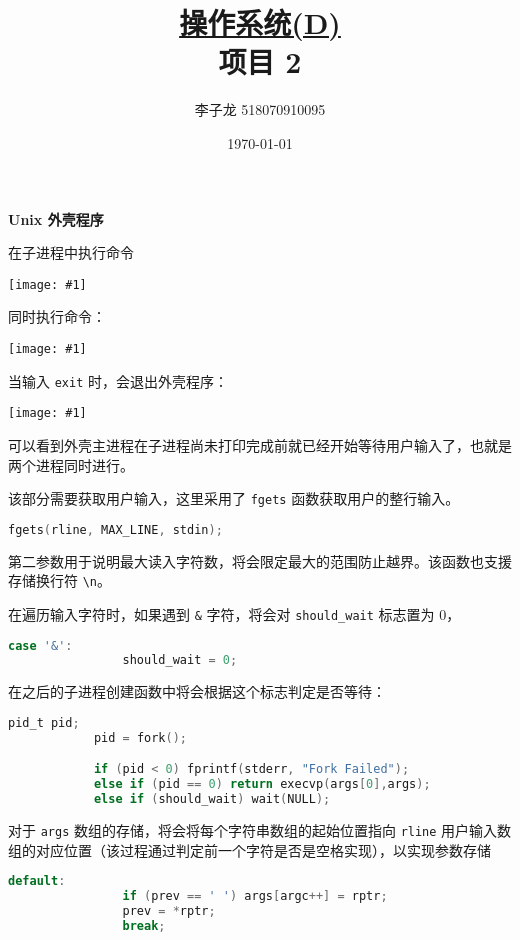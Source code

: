 \documentclass[12pt,a4paper]{article}
\newenvironment{problems}{\begin{list}{}{\renewcommand{\makelabel}[1]{\textbf{##1}\hfil}}}{\end{list}}
\newenvironment{steps}{\begin{list}{}{\renewcommand{\makelabel}[1]{##1.\hfil}}}{\end{list}}
\providecommand{\img}[1]{\texttt{[image: \#1]}}
\begin{document}
\title{\normalsize \underline{操作系统(D)}\\\LARGE 项目 2}
\author{李子龙 518070910095}
\date{\today}
\maketitle

\begin{problems}
    \item[一] \textbf{Unix 外壳程序}
    \begin{steps}
        
        \item[1] 在子进程中执行命令
        
        \img{ps.png}

        同时执行命令：

        \img{psc.png}

        当输入 \verb"exit" 时，会退出外壳程序：

        \img{exit.png}

        可以看到外壳主进程在子进程尚未打印完成前就已经开始等待用户输入了，也就是两个进程同时进行。

        该部分需要获取用户输入，这里采用了 \texttt{fgets} 函数获取用户的整行输入。
        \begin{lstlisting}[language=c]
            fgets(rline, MAX_LINE, stdin);
        \end{lstlisting}
        第二参数用于说明最大读入字符数，将会限定最大的范围防止越界。该函数也支援存储换行符 \verb"\n"。

        在遍历输入字符时，如果遇到 \verb"&" 字符，将会对 \verb"should_wait" 标志置为 0，
        \begin{lstlisting}[language=c]
            case '&':
                should_wait = 0;
        \end{lstlisting}
        在之后的子进程创建函数中将会根据这个标志判定是否等待：
        \begin{lstlisting}[language=c]
            pid_t pid;
            pid = fork();

            if (pid < 0) fprintf(stderr, "Fork Failed"); 
            else if (pid == 0) return execvp(args[0],args);
            else if (should_wait) wait(NULL);
        \end{lstlisting}

        对于 \verb"args" 数组的存储，将会将每个字符串数组的起始位置指向 \verb"rline" 用户输入数组的对应位置（该过程通过判定前一个字符是否是空格实现），以实现参数存储
        \begin{lstlisting}[language=c]
            default:
                if (prev == ' ') args[argc++] = rptr;
                prev = *rptr;
                break;
        \end{lstlisting}
        

\end{steps}
\end{problems}
\end{document}
